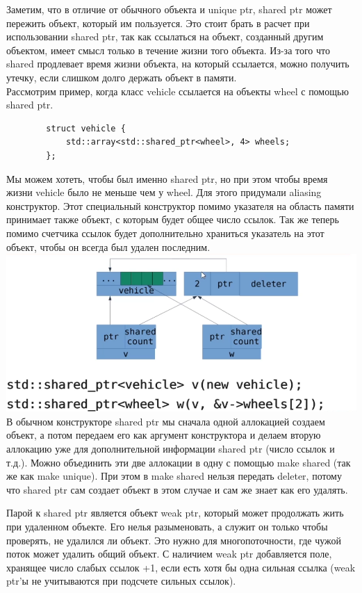 \documentclass[12pt, a4paper]{article}
\begin{document}
	Заметим, что в отличие от обычного объекта и unique ptr, shared ptr может пережить объект, который им пользуется. Это стоит брать в расчет при использовании shared ptr, так как ссылаться на объект, созданный другим объектом, имеет смысл только в течение жизни того объекта. Из-за того что shared продлевает время жизни объекта, на который ссылается, можно получить утечку, если слишком долго держать объект в памяти.\\
	Рассмотрим пример, когда класс vehicle ссылается на объекты wheel с помощью shared ptr. 
	\begin{verbatim}
		struct vehicle {
			std::array<std::shared_ptr<wheel>, 4> wheels;
		};
	\end{verbatim}
	Мы можем хотеть, чтобы был именно shared ptr, но при этом чтобы время жизни vehicle было не меньше чем у wheel. Для этого придумали aliasing конструктор. Этот специальный конструктор помимо указателя на область памяти принимает также объект, с которым будет общее число ссылок. Так же теперь помимо счетчика ссылок будет дополнительно храниться указатель на этот объект, чтобы он всегда был удален последним. \\
	\includegraphics[scale=0.5]{aliasing_ctor.png}\\
	В обычном конструкторе shared ptr мы сначала одной аллокацией создаем объект, а потом передаем его как аргумент конструктора и делаем вторую аллокацию уже для дополнительной информации shared ptr (число ссылок и т.д.). Можно объединить эти две аллокации в одну с помощью make shared (так же как make unique). При этом в make shared нельзя передать deleter, потому что shared ptr сам создает объект в этом случае и сам же знает как его удалять.\\\par
	Парой к shared ptr является объект weak ptr, который может продолжать жить при удаленном объекте. Его нелья разыменовать, а служит он только чтобы проверять, не удалился ли объект. Это нужно для многопоточности, где чужой поток может удалить общий объект. С наличием weak ptr добавляется поле, хранящее число слабых ссылок +1, если есть хотя бы одна сильная ссылка (weak ptr'ы не учитываются при подсчете сильных ссылок).
\end{document}
